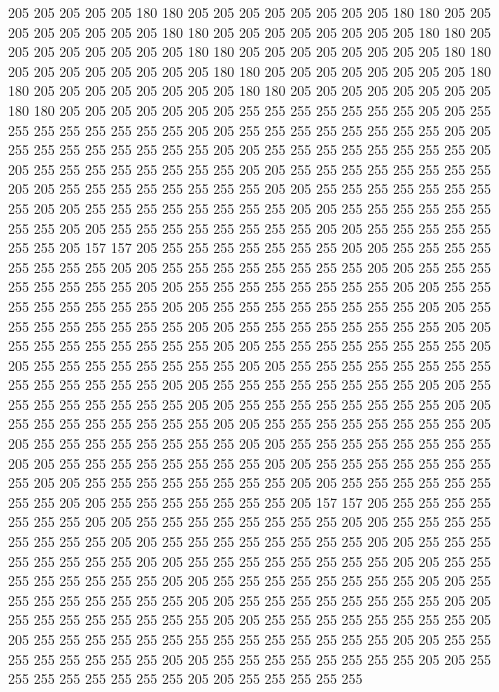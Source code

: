 205 205 205 205 205 180 180 205 205 205 205 205 205 205 205 180 180 205 205 205
205 205 205 205 205 180 180 205 205 205 205 205 205 205 205 180 180 205 205 205
205 205 205 205 205 180 180 205 205 205 205 205 205 205 205 180 180 205 205 205
205 205 205 205 205 180 180 205 205 205 205 205 205 205 205 180 180 205 205 205
205 205 205 205 205 180 180 205 205 205 205 205 205 205 205 180 180 205 205 205
205 205 205 205 255 255 255 255 255 255 255 205 205 255 255 255 255 255 255 255
255 205 205 255 255 255 255 255 255 255 255 205 205 255 255 255 255 255 255 255
255 205 205 255 255 255 255 255 255 255 255 205 205 255 255 255 255 255 255 255
255 205 205 255 255 255 255 255 255 255 255 205 205 255 255 255 255 255 255 255
255 205 205 255 255 255 255 255 255 255 255 205 205 255 255 255 255 255 255 255
255 205 205 255 255 255 255 255 255 255 255 205 205 255 255 255 255 255 255 255
255 205 205 255 255 255 255 255 255 255 205 157 157 205 255 255 255 255 255 255
255 205 205 255 255 255 255 255 255 255 255 205 205 255 255 255 255 255 255 255
255 205 205 255 255 255 255 255 255 255 255 205 205 255 255 255 255 255 255 255
255 205 205 255 255 255 255 255 255 255 255 205 205 255 255 255 255 255 255 255
255 205 205 255 255 255 255 255 255 255 255 205 205 255 255 255 255 255 255 255
255 205 205 255 255 255 255 255 255 255 255 205 205 255 255 255 255 255 255 255
255 205 205 255 255 255 255 255 255 255 255 205 205 255 255 255 255 255 255 255
255 255 255 255 255 255 255 205 205 255 255 255 255 255 255 255 255 205 205 255
255 255 255 255 255 255 255 205 205 255 255 255 255 255 255 255 255 205 205 255
255 255 255 255 255 255 255 205 205 255 255 255 255 255 255 255 255 205 205 255
255 255 255 255 255 255 255 205 205 255 255 255 255 255 255 255 255 205 205 255
255 255 255 255 255 255 255 205 205 255 255 255 255 255 255 255 255 205 205 255
255 255 255 255 255 255 255 205 205 255 255 255 255 255 255 255 255 205 205 255
255 255 255 255 255 255 205 157 157 205 255 255 255 255 255 255 255 205 205 255
255 255 255 255 255 255 255 205 205 255 255 255 255 255 255 255 255 205 205 255
255 255 255 255 255 255 255 205 205 255 255 255 255 255 255 255 255 205 205 255
255 255 255 255 255 255 255 205 205 255 255 255 255 255 255 255 255 205 205 255
255 255 255 255 255 255 255 205 205 255 255 255 255 255 255 255 255 205 205 255
255 255 255 255 255 255 255 205 205 255 255 255 255 255 255 255 255 205 205 255
255 255 255 255 255 255 255 205 205 255 255 255 255 255 255 255 255 255 255 255
255 255 255 205 205 255 255 255 255 255 255 255 255 205 205 255 255 255 255 255
255 255 255 205 205 255 255 255 255 255 255 255 255 205 205 255 255 255 255 255
